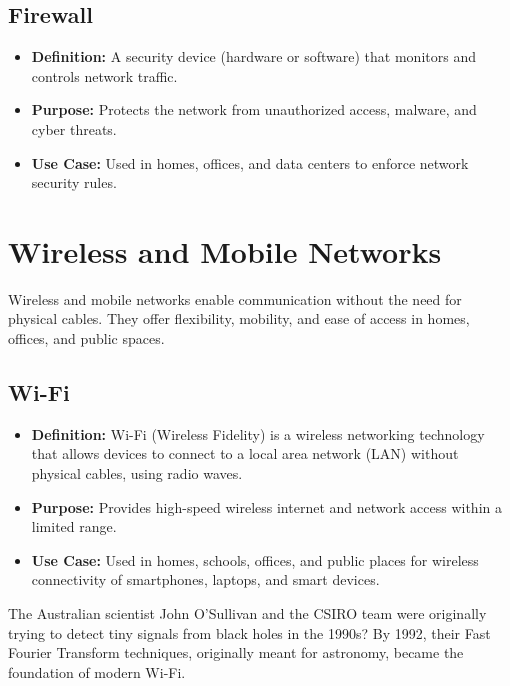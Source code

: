 \subsection{Firewall}
\begin{itemize}[leftmargin=1.5cm]
  \item \textbf{Definition:} A security device (hardware or software) that monitors and controls network traffic.
  \item \textbf{Purpose:} Protects the network from unauthorized access, malware, and cyber threats.
  \item \textbf{Use Case:} Used in homes, offices, and data centers to enforce network security rules.
\end{itemize}

\section{Wireless and Mobile Networks}

Wireless and mobile networks enable communication without the need for physical cables. They offer flexibility, mobility, and ease of access in homes, offices, and public spaces.

\subsection{Wi-Fi}
\begin{itemize}[leftmargin=1.5cm]
  \item \textbf{Definition:} Wi-Fi (Wireless Fidelity) is a wireless networking technology that allows devices to connect to a local area network (LAN) without physical cables, using radio waves.
  \item \textbf{Purpose:} Provides high-speed wireless internet and network access within a limited range.
  \item \textbf{Use Case:} Used in homes, schools, offices, and public places for wireless connectivity of smartphones, laptops, and smart devices.
\end{itemize}

\begin{didyouknowbox}
The Australian scientist John O'Sullivan and the CSIRO team were originally trying to detect tiny signals from black holes in the 1990s? By 1992, their Fast Fourier Transform techniques, originally meant for astronomy, became the foundation of modern Wi-Fi.
\end{didyouknowbox}





